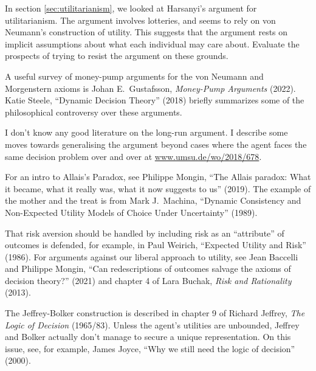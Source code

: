 \begin{essay}
  In section \ref{sec:utilitarianism}, we looked at Harsanyi's argument for
  utilitarianism. The argument involves lotteries, and seems to rely on von
  Neumann's construction of utility. This suggests that the argument rests on
  implicit assumptions about what each individual may care about. Evaluate the
  prospects of trying to resist the argument on these grounds.
\end{essay}

\begin{sources}

  A useful survey of money-pump arguments for the von Neumann and Morgenstern
  axioms is Johan E.\ Gustafsson, \emph{Money-Pump Arguments} (2022).
  Katie
  Steele, ``Dynamic Decision Theory'' (2018) briefly summarizes some of the
  philosophical controversy over these arguments.

  I don't know any good literature on the long-run argument. I describe some
  moves towards generalising the argument beyond cases where the agent faces the
  same decision problem over and over at
  \href{https://www.umsu.de/wo/2018/678}{www.umsu.de/wo/2018/678}.

  For an intro to Allais's Paradox, see Philippe Mongin, ``The Allais paradox:
  What it became, what it really was, what it now suggests to us'' (2019). The
  example of the mother and the treat is from Mark J.\ Machina, ``Dynamic
  Consistency and Non-Expected Utility Models of Choice Under Uncertainty'' (1989).

  That risk aversion should be handled by including risk as an ``attribute'' of
  outcomes is defended, for example, in Paul Weirich, ``Expected Utility and
  Risk'' (1986). For arguments against our liberal approach to utility,
  see Jean Baccelli and Philippe Mongin, ``Can redescriptions of outcomes
  salvage the axioms of decision theory?'' (2021) and chapter 4 of Lara Buchak,
  \emph{Risk and Rationality} (2013).
  
  The Jeffrey-Bolker construction is described in chapter 9 of Richard Jeffrey,
  \emph{The Logic of Decision} (1965/83). Unless the agent's utilities are
  unbounded, Jeffrey and Bolker actually don't manage to secure a unique
  representation. On this issue, see, for example, James Joyce, ``Why we still
  need the logic of decision'' (2000).
  
\end{sources}


